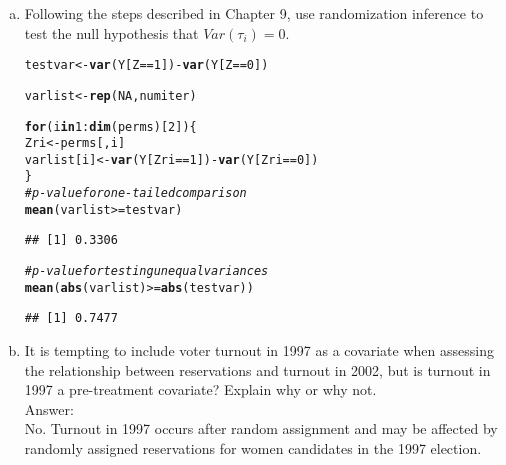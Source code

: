 \documentclass[11pt,notitlepage]{article}\usepackage[]{graphicx}\usepackage[]{color}
\makeatletter
\newcommand{\hlnum}[1]{\textcolor[rgb]{0.686,0.059,0.569}{#1}}%
\newcommand{\hlcom}[1]{\textcolor[rgb]{0.678,0.584,0.686}{\textit{#1}}}%
\newcommand{\hlopt}[1]{\textcolor[rgb]{0,0,0}{#1}}%
\newcommand{\hlstd}[1]{\textcolor[rgb]{0.345,0.345,0.345}{#1}}%
\newcommand{\hlkwa}[1]{\textcolor[rgb]{0.161,0.373,0.58}{\textbf{#1}}}%
\newcommand{\hlkwb}[1]{\textcolor[rgb]{0.69,0.353,0.396}{#1}}%
\newcommand{\hlkwd}[1]{\textcolor[rgb]{0.737,0.353,0.396}{\textbf{#1}}}%
\newenvironment{kframe}{%
 \def\at@end@of@kframe{}%
 \ifinner\ifhmode%
  \def\at@end@of@kframe{\end{minipage}}%
  \begin{minipage}{\columnwidth}%
 \fi\fi%
 \def\FrameCommand##1{\hskip\@totalleftmargin \hskip-\fboxsep
 \colorbox{shadecolor}{##1}\hskip-\fboxsep
     \hskip-\linewidth \hskip-\@totalleftmargin \hskip\columnwidth}%
 \MakeFramed {\advance\hsize-\width
   \@totalleftmargin\z@ \linewidth\hsize
   \@setminipage}}%
 {\par\unskip\endMakeFramed%
 \at@end@of@kframe}
\newenvironment{knitrout}{}{} %
\makeatother
\begin{document}
\begin{enumerate}[a)]
\item Following the steps described in Chapter 9, use randomization inference to test the null hypothesis that $Var(\tau_i) = 0$.

\begin{knitrout}
\color{fgcolor}\begin{kframe}
\begin{alltt}
\hlstd{testvar} \hlkwb{<-} \hlkwd{var}\hlstd{(Y[Z}\hlopt{==}\hlnum{1}\hlstd{])} \hlopt{-} \hlkwd{var}\hlstd{(Y[Z}\hlopt{==}\hlnum{0}\hlstd{])}

\hlstd{varlist} \hlkwb{<-} \hlkwd{rep}\hlstd{(}\hlnum{NA}\hlstd{,numiter)}

\hlkwa{for} \hlstd{(i} \hlkwa{in} \hlnum{1}\hlopt{:}\hlkwd{dim}\hlstd{(perms)[}\hlnum{2}\hlstd{]) \{}
        \hlstd{Zri} \hlkwb{<-} \hlstd{perms[,i]}
        \hlstd{varlist[i]} \hlkwb{<-} \hlkwd{var}\hlstd{(Y[Zri}\hlopt{==}\hlnum{1}\hlstd{])} \hlopt{-} \hlkwd{var}\hlstd{(Y[Zri}\hlopt{==}\hlnum{0}\hlstd{])}
\hlstd{\}}
\hlcom{# p-value for one-tailed comparison}
\hlkwd{mean}\hlstd{(varlist} \hlopt{>=} \hlstd{testvar)}
\end{alltt}
\begin{verbatim}
## [1] 0.3306
\end{verbatim}
\begin{alltt}
\hlcom{# p-value for testing unequal variances}
\hlkwd{mean}\hlstd{(}\hlkwd{abs}\hlstd{(varlist)} \hlopt{>=} \hlkwd{abs}\hlstd{(testvar))}
\end{alltt}
\begin{verbatim}
## [1] 0.7477
\end{verbatim}
\end{kframe}
\end{knitrout}

\item It is tempting to include voter turnout in 1997 as a covariate when assessing the relationship between reservations and turnout in 2002, but is turnout in 1997 a pre-treatment covariate? Explain why or why not.\\
Answer:\\
No. Turnout in 1997 occurs after random assignment and may be affected by randomly assigned reservations for women candidates in the 1997 election.
\end{enumerate}
\end{document}

